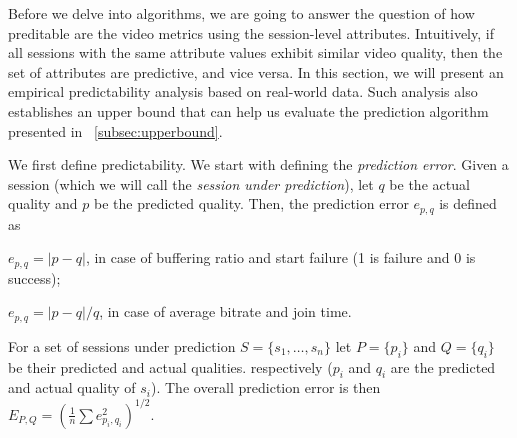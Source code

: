 \label{predictability}

Before we delve into algorithms, we are going to answer the question of how preditable are the video metrics using the session-level attributes. Intuitively, if all sessions with the same attribute values exhibit similar video quality, then the set of attributes are predictive, and vice versa. In this section, we will present an empirical predictability analysis based on real-world data. Such analysis also establishes an upper bound that can help us evaluate the prediction algorithm presented in \Section~\ref{subsec:upperbound}.

\label{subsec:upperbound}

We first define predictability. We start with defining the {\it prediction error}.  Given a session
(which we will call the {\it session under prediction}), let $q$ be
the actual quality and $p$ be the predicted quality. Then, the
prediction error $e_{p,q}$ is defined as
\begin{packeditemize}
	\item $e_{p,q}=|p-q|$, in case of buffering ratio and start failure (1 is failure and 0 is success);
	\item $e_{p,q}=|p-q|/q$, in case of average bitrate and join time.
\end{packeditemize}

For a set of sessions under prediction $S=\{s_1,\dots,s_n\}$ let $P=\{p_i\}$ and $Q=\{q_i\}$ be their predicted and actual qualities. respectively ($p_i$ and $q_i$ are the predicted and actual quality of $s_i$). The overall prediction error is then $E_{P,Q}=\left(\frac{1}{n}\sum e_{p_i,q_i}^2\right)^{1/2}$.



